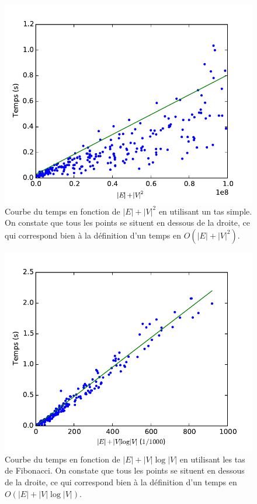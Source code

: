 \documentclass{article}
\begin{document}
\begin{figure}
  \begin{center}
    \includegraphics{reg_queue.pdf}
  \end{center}
  \caption{\label{fig:reg_queue}Courbe du temps en fonction de
    $|E| + |V|^2$ en utilisant un tas simple.
    On constate que tous les points se situent en
    dessous de la droite, ce qui correspond bien à la définition d'un
    temps en $O(|E| + |V|^2)$.}
\end{figure}
\begin{figure}
  \begin{center}
    \includegraphics{reg.pdf}
  \end{center}
  \caption{\label{fig:reg_fib}Courbe du temps en fonction de
    $|E| + |V|\log |V|$ en utilisant les tas de Fibonacci.
    On constate que tous les points se situent en
    dessous de la droite, ce qui correspond bien à la définition d'un
    temps en $O(|E| + |V|\log |V|)$.}
\end{figure}
\end{document}
